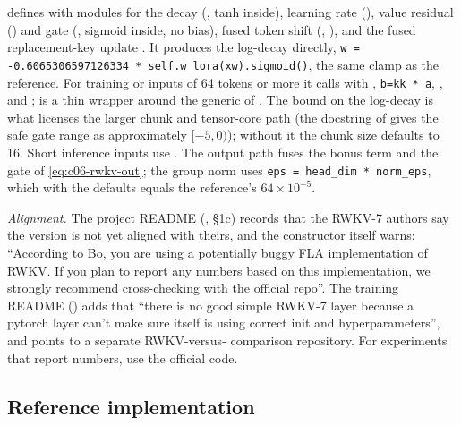 \begin{implnote}[title={In the code: the \fla{} version and its alignment}]
 defines
 with  modules for the decay (, tanh inside),
learning rate (), value residual () and gate (,
sigmoid inside, no bias), fused token shift (, ),
and the fused replacement-key update . It produces the log-decay
directly, \texttt{w = -0.6065306597126334 * self.w\_lora(xw).sigmoid()}, the same clamp as the
reference. For training or inputs of 64 tokens or more it calls  with
, \texttt{b=kk * a}, , 
and ;  is a thin wrapper around the generic
 of . The bound on the
log-decay is what licenses the larger chunk and tensor-core path (the docstring of
 gives the safe gate range as approximately $[-5,0)$); without it the chunk
size defaults to 16. Short inference inputs use . The output
path  fuses the bonus term and the gate of
\eqref{eq:c06-rwkv-out}; the group norm uses \texttt{eps = head\_dim * norm\_eps}, which with the
defaults equals the reference's $64\times10^{-5}$.

\emph{Alignment.} The project README (, \S1c) records that the RWKV-7
authors say the \fla{} version is not yet aligned with theirs, and the \fla{} constructor
itself warns: ``According to Bo, you are using a potentially buggy FLA implementation of
RWKV. If you plan to report any numbers based on this implementation, we strongly recommend
cross-checking with the official repo''. The training README
() adds that ``there is no good
simple RWKV-7 layer because a pytorch layer can't make sure itself is using correct init and
hyperparameters'', and points to a separate RWKV-versus-\fla{} comparison repository. For
experiments that report numbers, use the official code.
\end{implnote}

\subsection{Reference implementation}

